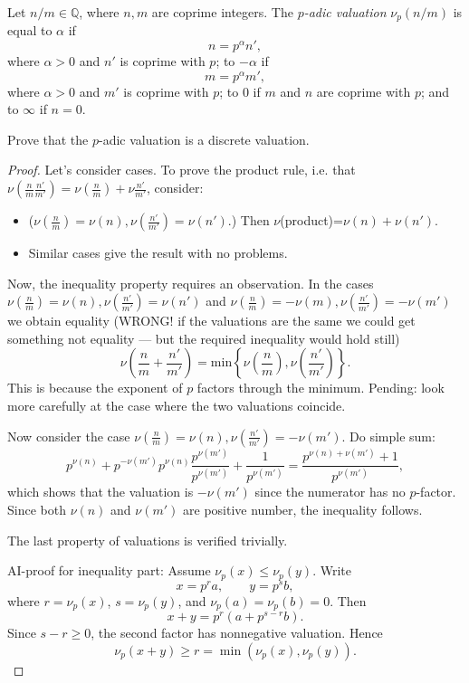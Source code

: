 \begin{definition}
\label{definition-p-adic-valuation}
Let $n/m \in \mathbb Q$, where $n,m$
are coprime integers. The {\it
$p$-adic valuation} $\nu_p(n/m)$ is
equal to $\alpha$ if
$$
n=p^\alpha n',
$$
where $\alpha>0$ and $n'$ is coprime
with $p$; to $-\alpha$ if
$$
m=p^\alpha m',
$$
where $\alpha>0$ and $m'$ is coprime
with $p$; to $0$ if $m$ and $n$ are
coprime with $p$; and to $\infty$ if
$n=0$.
\end{definition}

\begin{exercise}
\label{exercise-p-adic-valuation-discrete}
Prove that the $p$-adic valuation is
a discrete valuation.
\end{exercise}

\begin{proof}
Let's consider cases.
To prove the product rule, i.e.
that $\nu\left(\frac{n}{m}
\frac{n'}{m'}\right)
=\nu\left(\frac{n}{m}\right)+
\nu\frac{n'}{m'}$, consider:
\begin{itemize}
\item ($\nu
\left(\frac{n}{m}\right)=\nu(n),
\nu\left(\frac{n'}{m'}\right)=\nu(n')$.)
Then $\nu$(product)=$\nu(n)+\nu(n')$.
\item Similar cases give the result
with no problems.
\end{itemize}

\noindent
Now, the inequality property requires
an observation. In the cases
$\nu\left(\frac{n}{m}\right)=\nu(n),
\nu\left(\frac{n'}{m'}\right)=\nu(n')$
and $\nu\left(\frac{n}{m}\right)=-\nu(m),
\nu\left(\frac{n'}{m'}\right)=-\nu(m')$
we obtain equality
(WRONG! if the valuations
are the same we could 
get something not equality 
--- but the required inequality
would hold still)
$$
\nu\left(\frac{n}{m}
+\frac{n'}{m'}\right)
=\text{min}\left\{
\nu\left(\frac{n}{m}\right),
\nu\left(\frac{n'}{m'}\right)\right\}.
$$
This is because the
exponent of $p$ factors through the minimum.
Pending: look more carefully at the
case where the two valuations coincide.

Now consider the case
$\nu\left(\frac{n}{m}\right)=\nu(n),
\nu\left(\frac{n'}{m'}\right)=-\nu(m')$.
Do simple sum:
$$
p^{\nu(n)}+p^{-\nu(m')}
p^{\nu(n)}
\frac{p^{\nu(m')}}{p^{\nu(m')}}
+\frac{1}{p^{\nu(m')}}
=
\frac{p^{\nu(n)+\nu(m')}+1}
{p^{\nu(m')}},
$$
which shows that the valuation is
$-\nu(m')$ since the numerator
has no $p$-factor.
Since both $\nu(n)$ and $\nu(m')$ 
are positive number, the inequality follows.

The last property of valuations 
is verified trivially.


\medskip\noindent
AI-proof for inequality part:
Assume $\nu_p(x)\leq \nu_p(y)$.
Write
$$
x=p^r a,\qquad y=p^s b,
$$
where $r=\nu_p(x)$, $s=\nu_p(y)$,
and $\nu_p(a)=\nu_p(b)=0$.
Then
$$
x+y=p^r(a+p^{s-r}b).
$$
Since $s-r\geq 0$, the second factor
has nonnegative valuation. Hence
$$
\nu_p(x+y)\geq r
=
\min(\nu_p(x),\nu_p(y)).
$$
\end{proof}

